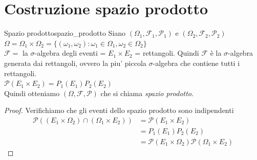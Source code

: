 \documentclass[12pt]{report}
\newcounter{definition}
\newcommand{\nmu}{}
\begin{document}
	\section{Costruzione spazio prodotto}
	\begin{definition}{\nmu Spazio prodotto}{spazio_prodotto}
		Siano $(\Omega_1, \mathcal{F}_1, \mathcal{P}_1)$ e $(\Omega_2, \mathcal{F}_2, \mathcal{P}_2)$ \\
		$\Omega = \Omega_1 \times \Omega_2 = \{(\omega_1, \omega_2) : \omega_1 \in \Omega_1, \omega_2 \in \Omega_2\}$ \\
		$\mathcal{F} = $ la $\sigma$-algebra degli eventi = $E_1 \times E_2$ = rettangoli. Quindi $\mathcal{F}$ è la $\sigma$-algebra generata dai rettangoli, ovvero la piu' piccola $\sigma$-algebra che contiene tutti i rettangoli. \\
		$\mathcal{P}(E_1 \times E_2) =P_1(E_1)P_2(E_2)$ \\
		Quindi otteniamo $(\Omega, \mathcal{F}, \mathcal{P})$ che si chiama \textit{spazio prodotto}.
	\end{definition}
	\begin{proof}{\nmu Verifichiamo che gli eventi dello spazio prodotto sono indipendenti} \\
		\begin{align*}
			\mathcal{P}((E_1 \times \Omega_2) \cap (\Omega_1 \times E_2)) &= \mathcal{P}(E_1 \times E_2) \\ &= P_1(E_1)P_2(E_2) \\ &= \mathcal{P}(E_1 \times \Omega_2)\mathcal{P}(\Omega_1 \times E_2)
		\end{align*}
	\end{proof}
\end{document}
